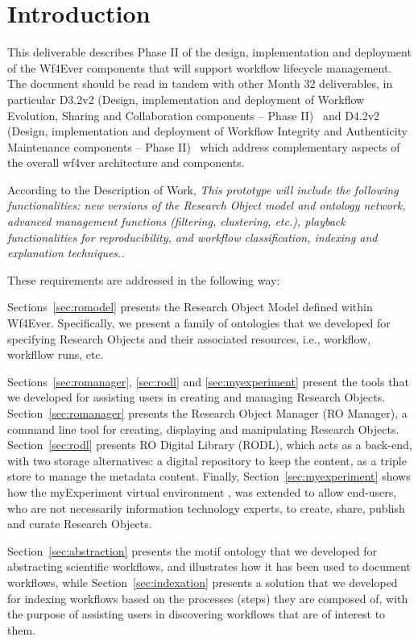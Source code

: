 \section{Introduction}

This deliverable describes Phase II of the design, implementation and
deployment of the Wf4Ever components that will support workflow
lifecycle management. The document should be read in tandem with other
Month 32 deliverables, in particular D3.2v2 (Design, implementation
and deployment of Workflow Evolution, Sharing and Collaboration
components -- Phase II)~\cite{D3.2v2} and D4.2v2 (Design,
implementation and deployment of Workflow Integrity and Authenticity
Maintenance components -- Phase II)~\cite{D4.2v2} which address
complementary aspects of the overall wf4ver architecture and
components.

According to the Description of Work, \emph{This prototype will include the following functionalities: new versions of the Research Object model and ontology network, advanced management functions (filtering, clustering, etc.), playback functionalities for reproducibility, and workflow classification, indexing and explanation techniques.}. 

These requirements are addressed in the following way:

Sections~\ref{sec:romodel} presents the Research Object Model defined within Wf4Ever. Specifically, we present a family of ontologies that we developed for specifying Research Objects and their associated resources, i.e., workflow, workfllow runs, etc. 

Sections~\ref{sec:romanager}, \ref{sec:rodl} and \ref{sec:myexperiment} present the tools that we developed for assisting users in creating and managing Research Objects. Section~\ref{sec:romanager} presents the Research Object Manager (RO Manager), a command line tool for creating, displaying and manipulating Research Objects. Section~\ref{sec:rodl} presents RO Digital Library (RODL), which acts as a back-end, with two storage alternatives: a digital repository to keep the content, as a triple store to manage the metadata content. Finally, Section~\ref{sec:myexperiment} shows how the myExperiment virtual environment \cite{DBLP:journals/fgcs/RoureGS09}, was extended to allow end-users, who are not necessarily information technology experts, to create, share, publish and curate Research Objects.

Section~\ref{sec:abstraction} presents the motif ontology that we developed for abstracting scientific workflows, and illustrates how it has been used to document workflows, while Section~\ref{sec:indexation} presents a solution that we developed for indexing workflows based on the processes (steps) they are composed of, with the purpose of assisting users in discovering workflows that are of interest to them. 
